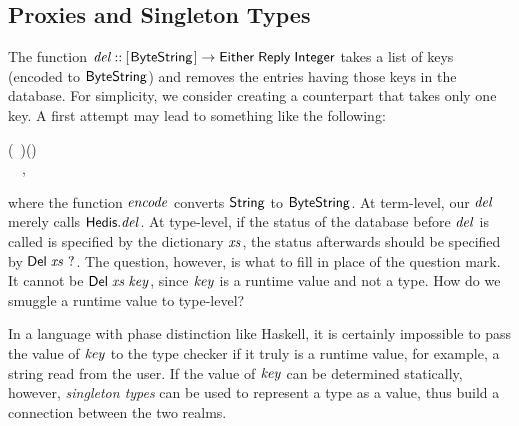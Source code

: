 \subsection{Proxies and Singleton Types}

The \Hedis{} function \ensuremath{\Varid{del}\mathbin{::}[\mskip1.5mu \Conid{ByteString}\mskip1.5mu]\to \Conid{Either}\;\Conid{Reply}\;\Conid{Integer}} takes a list
of keys (encoded to \ensuremath{\Conid{ByteString}}) and removes the entries having those keys in
the database. For simplicity, we consider creating a \Edis{} counterpart
that takes only one key. A first attempt may lead to something like the
following:
\begin{hscode}\SaveRestoreHook
{}%
%
\>[B]{}\mathbin{::}\to {}\;\;(\;~)\;(\;\;){}\<[E]%
\\
\>[B]{}\;\mathrel{=}\mathbin{\$}~~,{}\<[E]%
\ColumnHook
\end{hscode}\resethooks
where the function \ensuremath{\Varid{encode}} converts \ensuremath{\Conid{String}} to \ensuremath{\Conid{ByteString}}. At term-level,
our \ensuremath{\Varid{del}} merely calls \ensuremath{\Varid{\Conid{Hedis}.del}}. At
type-level, if the status of the database before \ensuremath{\Varid{del}} is called is specified
by the dictionary \ensuremath{\Varid{xs}}, the status afterwards should be specified by
\ensuremath{\Conid{Del}\;\Varid{xs}~\mathbin{?}}. The question, however, is what to fill in place of the
question mark. It cannot be \ensuremath{\Conid{Del}\;\Varid{xs}\;\Varid{key}}, since \ensuremath{\Varid{key}} is a runtime value and
not a type. How do we smuggle a runtime value to type-level?

In a language with phase distinction like Haskell, it is certainly impossible
to pass the value of \ensuremath{\Varid{key}} to the type checker if it truly is a runtime value,
for example, a string read from the user. If the value of \ensuremath{\Varid{key}} can be
determined statically, however, {\em singleton types} can be used to represent a
type as a value, thus build a connection between the two realms.

